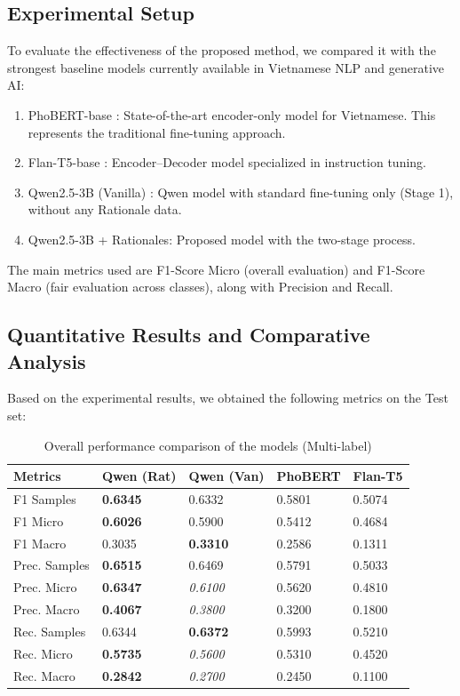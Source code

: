 \documentclass[11pt]{article}
\begin{document}
\subsection{Experimental Setup}
To evaluate the effectiveness of the proposed method, we compared it with the strongest
baseline models currently available in Vietnamese NLP and generative AI:
\begin{enumerate}[leftmargin=*]
\item PhoBERT-base \citep{nguyen2020phobert}: State-of-the-art encoder-only model for Vietnamese. This represents
the traditional fine-tuning approach.
\item Flan-T5-base \citep{chung2022scaling}: Encoder–Decoder model specialized in instruction tuning.
\item Qwen2.5-3B (Vanilla) \citep{Yang2025Qwen25}: Qwen model with standard fine-tuning only (Stage 1), without
any Rationale data.
\item Qwen2.5-3B + Rationales: Proposed model with the two-stage process.
\end{enumerate}
The main metrics used are F1-Score Micro (overall evaluation) and F1-Score Macro (fair
evaluation across classes), along with Precision and Recall.

\subsection{Quantitative Results and Comparative Analysis}
Based on the experimental results, we obtained the following metrics on the Test set:

\begin{table}[ht]
\centering
\caption{Overall performance comparison of the models (Multi-label)}
\label{tab:overall_perf_expanded}
\setlength{\tabcolsep}{2pt} %
\scriptsize %
\begin{tabularx}{\columnwidth}{lXXXX}
\toprule
\textbf{Metrics} & \textbf{Qwen (Rat)} & \textbf{Qwen (Van)} & \textbf{PhoBERT} & \textbf{Flan-T5} \\
\midrule
F1 Samples      & \textbf{0.6345} & 0.6332          & 0.5801 & 0.5074 \\
F1 Micro        & \textbf{0.6026} & 0.5900          & 0.5412 & 0.4684 \\
F1 Macro        & 0.3035          & \textbf{0.3310} & 0.2586 & 0.1311 \\
\midrule
Prec. Samples   & \textbf{0.6515} & 0.6469          & 0.5791 & 0.5033 \\
Prec. Micro     & \textbf{0.6347} & \textit{0.6100} & 0.5620 & 0.4810 \\
Prec. Macro     & \textbf{0.4067} & \textit{0.3800} & 0.3200 & 0.1800 \\
\midrule
Rec. Samples    & 0.6344          & \textbf{0.6372} & 0.5993 & 0.5210 \\
Rec. Micro      & \textbf{0.5735} & \textit{0.5600} & 0.5310 & 0.4520 \\
Rec. Macro      & \textbf{0.2842} & \textit{0.2700} & 0.2450 & 0.1100 \\
\bottomrule
\end{tabularx}
\end{table}
\end{document}
